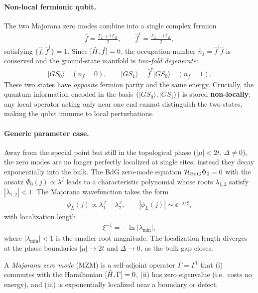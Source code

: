 \paragraph{Non-local fermionic qubit.}
The two Majorana zero modes combine into a single complex fermion
\begin{align}
    \hat{f} = \frac{\Gamma_L + \ii\,\Gamma_R}{2}, \qquad
    \hat{f}^{\dag} = \frac{\Gamma_L - \ii\,\Gamma_R}{2},
    \label{eq:nonlocal_fermion}
\end{align}
satisfying $\{\hat{f},\hat{f}^{\dag}\} = 1$. Since $[\hat{H},\hat{f}] = 0$, the occupation number $\hat{n}_f = \hat{f}^{\dag}\hat{f}$ is conserved and the ground-state manifold is \emph{two-fold degenerate}:
\begin{align}
    |GS_0\rangle \quad (n_f = 0),\qquad |GS_1\rangle = \hat{f}^{\dag}|GS_0\rangle \quad (n_f = 1).
\end{align}
These two states have \emph{opposite} fermion parity and the same energy. Crucially, the quantum information encoded in the basis $\{|GS_0\rangle, |GS_1\rangle\}$ is stored \textbf{non-locally}: any local operator acting only near one end cannot distinguish the two states, making the qubit immune to local perturbations.

\paragraph{Generic parameter case.}
Away from the special point but still in the topological phase ($|\mu| < 2t$, $\Delta \neq 0$), the zero modes are no longer perfectly localized at single sites; instead they decay exponentially into the bulk. The BdG zero-mode equation $\mathcal{H}_{\rm BdG}\Phi_0 = 0$ with the ansatz $\Phi_0(j) \propto \lambda^j$ leads to a characteristic polynomial whose roots $\lambda_{1,2}$ satisfy $|\lambda_{1,2}| < 1$. The Majorana wavefunction takes the form
\begin{align}
    \phi_{L}(j) \propto \lambda_1^{\,j} - \lambda_2^{\,j}, \qquad
    |\phi_L(j)| \sim \ee^{-j/\xi},
\end{align}
with localization length
\begin{align}
    \xi^{-1} = -\ln|\lambda_{\min}|,
\end{align}
where $|\lambda_{\min}| < 1$ is the smaller root magnitude. The localization length diverges at the phase boundaries $|\mu| \to 2t$ and $\Delta \to 0$, as the bulk gap closes.

\begin{definition}
A \emph{Majorana zero mode} (MZM) is a self-adjoint operator $\Gamma = \Gamma^{\dag}$ that (i) commutes with the Hamiltonian $[\hat{H},\Gamma] = 0$, (ii) has zero eigenvalue (i.e.\ costs no energy), and (iii) is exponentially localized near a boundary or defect.
\end{definition}

